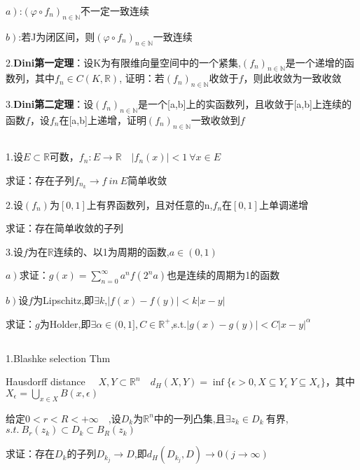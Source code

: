 \documentclass[hyperfer,UTF8,a4paper,12pt]{article}
\theoremstyle{plain}
\begin{document}
$\left.a\right)$:$ (\varphi\circ f_n)_{n\in\mathbb{N}} $不一定一致连续

$\left.b\right)$:若J为闭区间，则$ (\varphi\circ f_n)_{n\in\mathbb{N}} $一致连续

2.\textbf{Dini第一定理}：设K为有限维向量空间中的一个紧集,$ (f_n)_{n\in \mathbb{N}} $是一个递增的函数列，其中$ f_n\in C(K,\mathbb{R}) $,
证明：若$ (f_n)_{n\in \mathbb{N}} $收敛于$ f $，则此收敛为一致收敛

3.\textbf{Dini第二定理}：设$ (f_n)_{n\in \mathbb{N}} $是一个[a,b]上的实函数列，且收敛于[a,b]上连续的函数$ f $，设$ f_n$在[a,b]上递增，证明$ (f_n)_{n\in \mathbb{N}} $一致收敛到$ f $


\subsection{}\noindent
1.设$E \subset \mathbb{R} $可数，$ f_n:E\to \mathbb{R} \quad \vert f_n(x)\vert<1\ \forall x\in E$

求证：存在子列$ f_{n_k}\to f \ in\ E$简单收敛

2.设$(f_n)$为$ [0,1] $上有界函数列，且对任意的n,$ f_n $在$ [0,1] $上单调递增

求证：存在简单收敛的子列

3.设$ f $为在$ \mathbb{R} $连续的、以1为周期的函数,$ a\in (0,1) $

$\left.a\right) $求证：$ g(x)=\sum\limits_{n=0}^\infty a^nf(2^n a) $也是连续的周期为1的函数

$\left.b\right) $设$ f $为Lipschitz,即$ \exists k $,$ \vert f(x)-f(y)\vert < k\vert x-y\vert $ 

求证：$ g $为Holder,即$ \exists\alpha\in(0,1] ,C\in \mathbb{R}^+$,s.t.$ \vert g(x)-g(y)\vert < C\vert x-y\vert^\alpha  $

\subsection{}\noindent
1.Blashke selection Thm


Hausdorff distance $\quad X,Y\subset\mathbb{R}^n \quad d_H(X,Y)=\inf\{\epsilon> 0,X\subseteq Y_\epsilon\ Y\subseteq X_\epsilon \} $，其中$ X_\epsilon=\bigcup\limits_{x\in X} B(x,\epsilon) $

给定$ 0<r<R<+\infty\quad$,设$ D_k$为$ \mathbb{R}^n $中的一列凸集,且$ \exists z_k\in D_k\ $有界, $ s.t.\ B_r(z_k)\subset D_k\subset B_R(z_k) $

求证：存在$ D_k $的子列$ D_{k_j}\to D $,即$ d_H(D_{k_j},D)\to 0(j\to\infty) $
\end{document}
